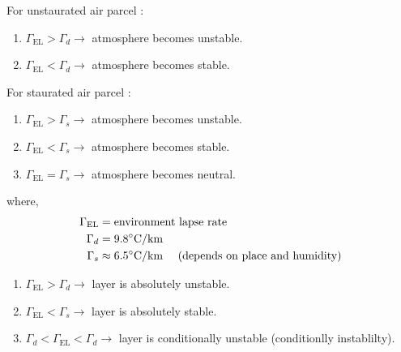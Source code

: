 \documentclass[fleqn,10pt]{SelfArx} %
\begin{document}
For unstaurated air parcel :
\begin{enumerate}[noitemsep]
    \item $\Gamma_{\text{EL}} > \Gamma_d \rightarrow$ atmosphere becomes unstable.
    \item $\Gamma_{\text{EL}} < \Gamma_d \rightarrow$ atmosphere becomes stable.
\end{enumerate}
For staurated air parcel :
\begin{enumerate}[noitemsep]
    \item $\Gamma_{\text{EL}} > \Gamma_s \rightarrow$ atmosphere becomes unstable.
    \item $\Gamma_{\text{EL}} < \Gamma_s \rightarrow$ atmosphere becomes stable.
    \item $\Gamma_{\text{EL}} = \Gamma_s \rightarrow$ atmosphere becomes neutral.
\end{enumerate}
where,\vspace{-0.2cm}
\begin{align*}
    \Gamma_{\text{EL}} &= \text{environment lapse rate} \\
    \Gamma_d &= 9.8^{\circ}\text{C/km} \\
    \Gamma_s &\approx 6.5^{\circ}\text{C/km \quad (depends on place and humidity)}
\end{align*}
\begin{enumerate}[noitemsep]
    \item $\Gamma_{\text{EL}} > \Gamma_d \rightarrow$ layer is absolutely unstable.
    \item $\Gamma_{\text{EL}} < \Gamma_s \rightarrow$ layer is absolutely stable.
    \item $\Gamma_d < \Gamma_{\text{EL}} < \Gamma_d \rightarrow$ layer is conditionally unstable (conditionlly instablilty).
\end{enumerate}
\end{document}
